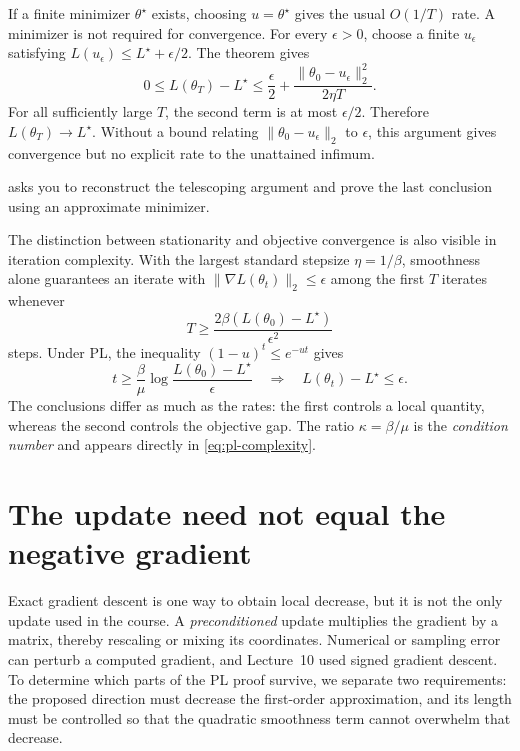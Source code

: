 \documentclass[11pt,twoside]{article}
\theoremstyle{definition}
\theoremstyle{remark}
\begin{document}
If a finite minimizer $\theta^\star$ exists, choosing $u=\theta^\star$ gives
the usual $O(1/T)$ rate. A minimizer is not required for convergence. For
every $\epsilon>0$, choose a finite $u_\epsilon$ satisfying
$L(u_\epsilon)\le L^\star+\epsilon/2$. The theorem gives
\[
 0\le L(\theta_T)-L^\star
 \le \frac\epsilon2
    +\frac{\|\theta_0-u_\epsilon\|_2^2}{2\eta T}.
\]
For all sufficiently large $T$, the second term is at most $\epsilon/2$.
Therefore $L(\theta_T)\to L^\star$. Without a bound relating
$\|\theta_0-u_\epsilon\|_2$ to $\epsilon$, this argument gives convergence
but no explicit rate to the unattained infimum.

 asks you to reconstruct the telescoping
argument and prove the last conclusion using an approximate minimizer.

The distinction between stationarity and objective convergence is also
visible in iteration complexity. With the largest standard stepsize
$\eta=1/\beta$, smoothness alone guarantees an iterate with
$\|\nabla L(\theta_t)\|_2\le\epsilon$ among the first $T$ iterates whenever
\begin{equation}
 T\ge
 \frac{2\beta(L(\theta_0)-L^\star)}{\epsilon^2}
 \label{eq:stationarity-complexity}
\end{equation}
steps. Under PL, the inequality $(1-u)^t\le e^{-ut}$ gives
\begin{equation}
 t\ge\frac\beta\mu
 \log\frac{L(\theta_0)-L^\star}{\epsilon}
 \quad\Longrightarrow\quad
 L(\theta_t)-L^\star\le\epsilon.
 \label{eq:pl-complexity}
\end{equation}
The conclusions differ as much as the rates: the first controls a local
quantity, whereas the second controls the objective gap. The ratio
$\kappa=\beta/\mu$ is the \emph{condition number} and appears directly in
\cref{eq:pl-complexity}.

\section{The update need not equal the negative gradient}
\label{sec:aligned-updates}

Exact gradient descent is one way to obtain local decrease, but it is not the
only update used in the course. A \emph{preconditioned} update multiplies the
gradient by a matrix, thereby rescaling or mixing its coordinates. Numerical
or sampling error can perturb a computed gradient, and Lecture~10 used signed
gradient descent. To determine which parts of the PL proof survive, we
separate two requirements: the proposed direction must decrease the
first-order approximation, and its length must be controlled so that the
quadratic smoothness term cannot overwhelm that decrease.
\end{document}
